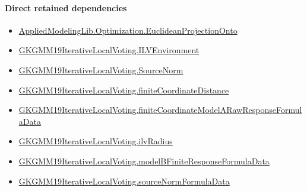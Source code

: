 \documentclass[10pt]{article}
\begin{document}
\paragraph{Direct retained dependencies}
\begin{itemize}\raggedright
\item \hyperlink{governing-declaration-016d335b2ad8f4ac}{Applied\allowbreak{}Modeling\allowbreak{}Lib.\allowbreak{}Optimization.\allowbreak{}Euclidean\allowbreak{}Projection\allowbreak{}Onto}
\item \hyperlink{governing-declaration-df2ca62df1846667}{GKGMM19\allowbreak{}Iterative\allowbreak{}Local\allowbreak{}Voting.\allowbreak{}ILV\allowbreak{}Environment}
\item \hyperlink{governing-declaration-6fa4ab9852321b03}{GKGMM19\allowbreak{}Iterative\allowbreak{}Local\allowbreak{}Voting.\allowbreak{}Source\allowbreak{}Norm}
\item \hyperlink{governing-declaration-54228ebaec750c58}{GKGMM19\allowbreak{}Iterative\allowbreak{}Local\allowbreak{}Voting.\allowbreak{}finite\allowbreak{}Coordinate\allowbreak{}Distance}
\item \hyperlink{paper-prerequisite-a8134359178155da}{GKGMM19\allowbreak{}Iterative\allowbreak{}Local\allowbreak{}Voting.\allowbreak{}finite\allowbreak{}Coordinate\allowbreak{}Model\allowbreak{}A\allowbreak{}Raw\allowbreak{}Response\allowbreak{}Formula\allowbreak{}Data}
\item \hyperlink{governing-declaration-2cfd8c76662024e1}{GKGMM19\allowbreak{}Iterative\allowbreak{}Local\allowbreak{}Voting.\allowbreak{}ilv\allowbreak{}Radius}
\item \hyperlink{paper-prerequisite-9418c34a2afc37e8}{GKGMM19\allowbreak{}Iterative\allowbreak{}Local\allowbreak{}Voting.\allowbreak{}model\allowbreak{}B\allowbreak{}Finite\allowbreak{}Response\allowbreak{}Formula\allowbreak{}Data}
\item \hyperlink{paper-prerequisite-d7774e2d1adfed0f}{GKGMM19\allowbreak{}Iterative\allowbreak{}Local\allowbreak{}Voting.\allowbreak{}source\allowbreak{}Norm\allowbreak{}Formula\allowbreak{}Data}
\end{itemize}
\end{document}
